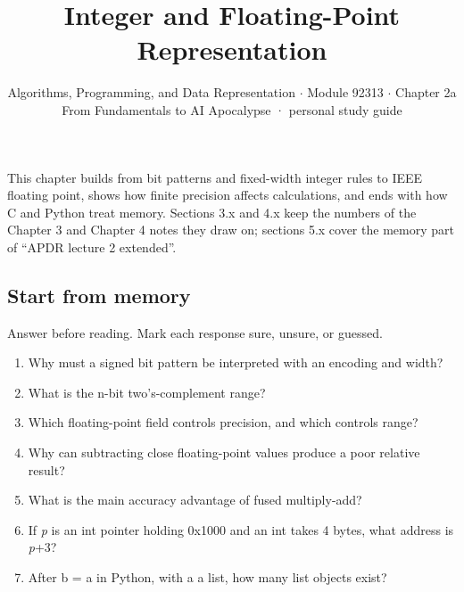 \documentclass[11pt]{article}
\title{\sffamily\bfseries\color{FAUblue}Integer and Floating-Point Representation}
\author{Algorithms, Programming, and Data Representation \ensuremath{\cdot} Module 92313 \ensuremath{\cdot} Chapter 2a\\[2pt]\small From Fundamentals to AI Apocalypse · personal study guide}
\date{}
\begin{document}
\maketitle
\begingroup\footnotesize\setlength{\parskip}{0pt}\tableofcontents\endgroup
\clearpage

{\large This chapter builds from bit patterns and fixed-width integer rules to IEEE floating point, shows how finite precision affects calculations, and ends with how C and Python treat memory. Sections 3.x and 4.x keep the numbers of the Chapter 3 and Chapter 4 notes they draw on; sections 5.x cover the memory part of “APDR lecture 2 extended”.}


\begin{keepsection}
\section{Start from memory}

Answer before reading. Mark each response sure, unsure, or guessed.

\begin{enumerate}
\item Why must a signed bit pattern be interpreted with an encoding and width?
\item What is the n-bit two’s-complement range?
\item Which floating-point field controls precision, and which controls range?
\item Why can subtracting close floating-point values produce a poor relative result?
\item What is the main accuracy advantage of fused multiply-add?
\item If \textit{p} is an int pointer holding 0x1000 and an int takes 4 bytes, what address is \textit{p}+3?
\item After b = a in Python, with a a list, how many list objects exist?
\end{enumerate}

\end{keepsection}
\end{document}
